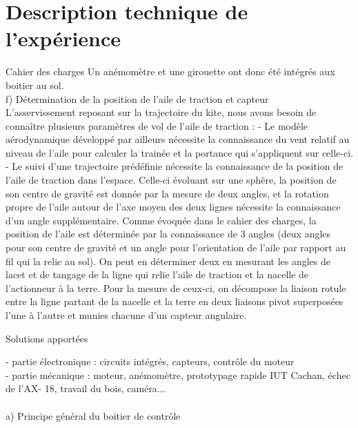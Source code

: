 \documentclass[a4paper,twoside,12pt]{article}
\newcounter{partie}
\newcounter{sous-partie}
\newenvironment{partie}[1]
{
\section{#1}
}
{

}
\newenvironment{sous-partie}[1]
{
\subsection{#1}
}
{

}
\begin{document}
\begin{partie}{Description technique de l'expérience}
\begin{sous-partie}{Cahier des charges}
Un anémomètre et une girouette ont donc été intégrés aux boitier au sol.
\\
f)	Détermination de la position de l'aile de traction et capteur\\
L'asservissement reposant sur la trajectoire du kite, nous avons besoin de connaître plusieurs paramètres de vol de l'aile de traction : 
-	Le modèle aérodynamique développé par ailleurs nécessite la connaissance du vent relatif au niveau de l'aile pour calculer la trainée et la portance qui s'appliquent sur celle-ci.
-	Le suivi d'une trajectoire prédéfinie nécessite la connaissance de la position de l'aile de traction dans l'espace. %
Celle-ci évoluant sur une sphère, la position de son centre de gravité est donnée par la mesure de deux angles, et la rotation propre de l'aile autour de l'axe moyen des deux lignes nécessite la connaissance d'un angle supplémentaire.
Comme évoquée dans le cahier des charges, la position de l'aile est déterminée par la connaissance de 3 angles  (deux angles pour son centre de gravité et un angle pour l'orientation de l'aile par rapport au fil qui la relie au sol).
On peut en déterminer deux en mesurant les angles de lacet et de tangage de la ligne qui relie l'aile de traction et la nacelle de l'actionneur à la terre. %
Pour la mesure de ceux-ci, on décompose la liaison rotule entre la ligne partant de la nacelle et la terre en deux liaisons pivot superposées l'une à l'autre et munies chacune d'un capteur angulaire.

\end{sous-partie}


\begin{sous-partie}{Solutions apportées}

- partie électronique : circuits intégrés, capteurs, contrôle du moteur \\

- partie mécanique : moteur, anémomètre, prototypage rapide IUT Cachan, échec de l'AX- 18, travail du bois, caméra... %
\\
\\

a) Principe général du boitier de contrôle




\end{sous-partie}
\end{partie}
\end{document}
